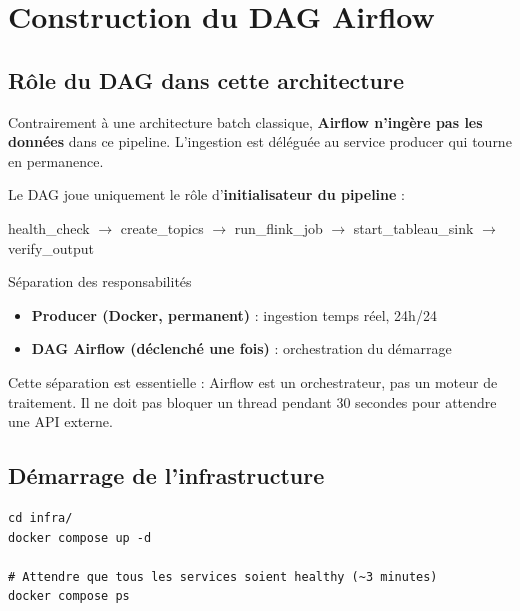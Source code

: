 \documentclass[12pt,a4paper]{article}
\begin{document}
\section{Construction du DAG Airflow}

\subsection{Rôle du DAG dans cette architecture}

Contrairement à une architecture batch classique, \textbf{Airflow n'ingère pas les données}
dans ce pipeline. L'ingestion est déléguée au service producer qui tourne en permanence.

Le DAG joue uniquement le rôle d'\textbf{initialisateur du pipeline} :

\begin{center}
\ttfamily\small
health\_check $\to$ create\_topics $\to$ run\_flink\_job $\to$ start\_tableau\_sink $\to$ verify\_output
\end{center}

\begin{conceptbox}{Séparation des responsabilités}
  \begin{itemize}
    \item \textbf{Producer (Docker, permanent)} : ingestion temps réel, 24h/24
    \item \textbf{DAG Airflow (déclenché une fois)} : orchestration du démarrage
  \end{itemize}
  Cette séparation est essentielle : Airflow est un orchestrateur, pas un moteur de traitement.
  Il ne doit pas bloquer un thread pendant 30 secondes pour attendre une API externe.
\end{conceptbox}

\subsection{Démarrage de l'infrastructure}

\begin{lstlisting}[style=bash, caption={Lancement des services Docker}]
cd infra/
docker compose up -d

# Attendre que tous les services soient healthy (~3 minutes)
docker compose ps
\end{lstlisting}
\end{document}
